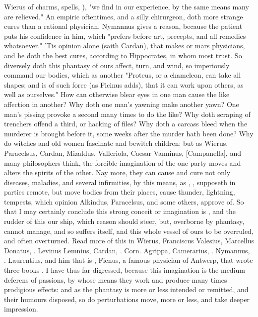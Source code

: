 Wierus of charms, spells, \etc{}), "we find in our
experience, by the same means many are relieved." An empiric oftentimes, and a
silly chirurgeon, doth more strange cures than a rational physician. Nymannus
gives a reason, because the patient puts his confidence in him,
which \Avicenna{} "prefers before art, precepts, and all
remedies whatsoever." 'Tis opinion alone (saith Cardan),
that makes or mars physicians, and he doth the best cures, according to
Hippocrates, in whom most trust. So diversely doth this phantasy of ours
affect, turn, and wind, so imperiously command our bodies, which as another
"Proteus, or a chameleon, can take all shapes; and is of
such force (as Ficinus adds), that it can work upon others, as well as
ourselves." How can otherwise blear eyes in one man cause the like affection in
another? Why doth one man's yawning make another yawn? One
man's pissing provoke a second many times to do the like? Why doth scraping of
trenchers offend a third, or hacking of files? Why doth a carcass bleed when
the murderer is brought before it, some weeks after the murder hath been done?
Why do witches and old women fascinate and bewitch children: but as Wierus,
Paracelsus, Cardan, Mizaldus, Valleriola, Caesar Vanninus,
[Campanella], and many philosophers think, the forcible
imagination of the one party moves and alters the spirits of the other. Nay
more, they can cause and cure not only diseases, maladies, and several
infirmities, by this means, as \Avicenna{}, , supposeth in parties remote, but move bodies from their places,
cause thunder, lightning, tempests, which opinion Alkindus, Paracelsus, and
some others, approve of. So that I may certainly conclude this strong conceit
or imagination is , and the rudder of this our ship, which
reason should steer, but, overborne by phantasy, cannot manage, and so suffers
itself, and this whole vessel of ours to be overruled, and often overturned.
Read more of this in Wierus,  Franciscus Valesius, 
Marcellus Donatus, .
Levinus Lemnius, 
Cardan, . Corn. Agrippa,
 Camerarius,
. Nymannus,
. Laurentius, and him that is , Fienus, a famous physician of Antwerp, that wrote three books . I have thus far digressed, because this imagination is
the medium deferens of passions, by whose means they work and produce many
times prodigious effects: and as the phantasy is more or less intended or
remitted, and their humours disposed, so do perturbations move, more or less,
and take deeper impression.

